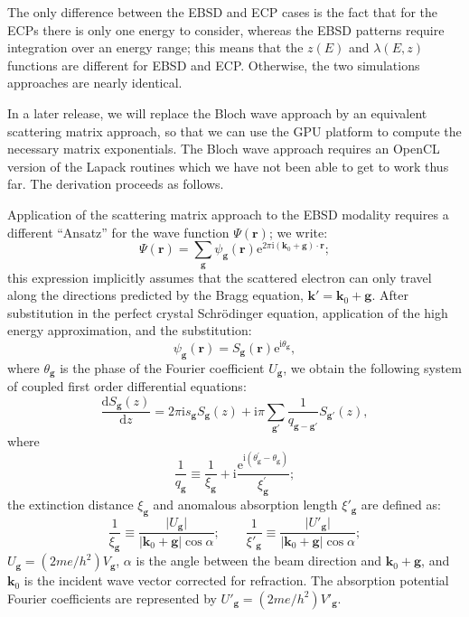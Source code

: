 \documentclass[DIV=calc, paper=letter, fontsize=11pt]{scrartcl}	 %
\begin{document}
The only difference between the EBSD and ECP cases is the fact that for the ECPs there is only one energy to consider,
whereas the EBSD patterns require integration over an energy range; this means that the $z(E)$ and $\lambda(E,z)$
functions are different for EBSD and ECP.  Otherwise, the two simulations approaches are nearly identical.
{\small
In a later release, we will replace the Bloch wave approach by an equivalent scattering matrix approach, so that we can use the GPU platform
to compute the necessary matrix exponentials.  The Bloch wave approach requires an OpenCL version of the Lapack routines
which we have not been able to get to work thus far.  The derivation proceeds as follows.

Application of the scattering matrix approach to the EBSD modality requires a different ``Ansatz'' for the wave 
function $\Psi(\mathbf{r})$; we write:
\begin{equation}
	\Psi(\mathbf{r}) = \sum_{\mathbf{g}} \psi_{\mathbf{g}}(\mathbf{r}) 
	\mathrm{e}^{2\pi\mathrm{i}(\mathbf{k}_0+\mathbf{g})\cdot\mathbf{r}};\label{eq:planewaves}
\end{equation}
this expression implicitly assumes that the scattered electron can only travel along the directions predicted by the 
Bragg equation, $\mathbf{k}'=\mathbf{k}_0+\mathbf{g}$.  After substitution in the perfect crystal Schr\"odinger equation,
application of the high energy approximation, and the substitution:
\begin{equation}
	\psi_\mathbf{g}(\mathbf{r}) = S_{\mathbf{g}}(\mathbf{r}) \mathrm{e}^{\mathrm{i}\theta_{\mathbf{g}}},\label{eq:psig}
\end{equation}
where $\theta_{\mathbf{g}}$ is the phase of the Fourier coefficient $U_{\mathbf{g}}$, we obtain the following system of 
coupled first order differential equations:
\begin{equation}
    \frac{\mathrm{d} S_{\mathbf{g}}(z)}{\mathrm{d}z} =
    2\pi\mathrm{i}s_{\mathbf{g}}S_{\mathbf{g}}(z) + \mathrm{i}\pi {\sum_{\mathbf{g}'}}
    \frac{1}
    {q_{\mathbf{g}-\mathbf{g}'}}S_{\mathbf{g}'}(z),\label{eq:defectequation}
\end{equation}
where
\begin{equation}
	\frac{1}{q_{\mathbf{g}}} \equiv \frac{1}{\xi_{\mathbf{g}}} + \mathrm{i}
	\frac{\mathrm{e}^{\mathrm{i} (\theta^{\prime}_{\mathbf{g}}-\theta_{\mathbf{g}})}}{\xi^{\prime}_{\mathbf{g}}};
	\label{eq:defineq}
\end{equation}
the extinction distance $\xi_{\mathbf{g}}$ and anomalous absorption length $\xi'_{\mathbf{g}}$ are defined as:
\begin{equation}
	\frac{1}{\xi_{\mathbf{g}}}\equiv \frac{\vert U_{\mathbf{g}}\vert}{\vert\mathbf{k}_0+\mathbf{g}\vert\cos\alpha};\qquad
	\frac{1}{\xi'_{\mathbf{g}}}\equiv \frac{\vert U'_{\mathbf{g}}\vert}{\vert\mathbf{k}_0+\mathbf{g}\vert\cos\alpha};
\end{equation}
$U_{\mathbf{g}} = (2me/h^2) V_{\mathbf{g}} $, $\alpha$ is the angle between the beam direction and $\mathbf{k}_0+\mathbf{g}$, and $\mathbf{k}_0$ is 
the incident wave vector corrected for refraction.  The absorption potential Fourier coefficients are represented by $U'_{\mathbf{g}} = (2me/h^2) V'_{\mathbf{g}}$.

}
\end{document}
